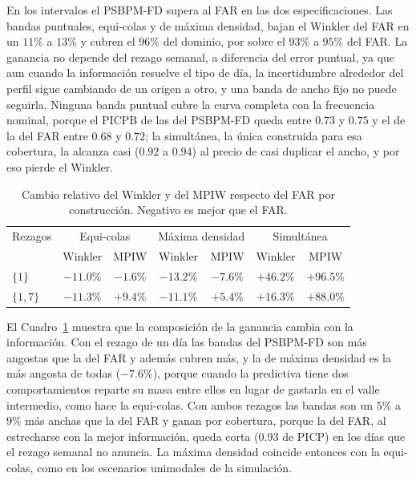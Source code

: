 En los intervalos el PSBPM-FD supera al FAR en las dos especificaciones. Las bandas puntuales, equi-colas y de máxima densidad, bajan el Winkler del FAR en un $11\%$ a $13\%$ y cubren el $96\%$ del dominio, por sobre el $93\%$ a $95\%$ del FAR. La ganancia no depende del rezago semanal, a diferencia del error puntual, ya que aun cuando la información resuelve el tipo de día, la incertidumbre alrededor del perfil sigue cambiando de un origen a otro, y una banda de ancho fijo no puede seguirla. Ninguna banda puntual cubre la curva completa con la frecuencia nominal, porque el PICPB de las del PSBPM-FD queda entre $0.73$ y $0.75$ y el de la del FAR entre $0.68$ y $0.72$; la simultánea, la única construida para esa cobertura, la alcanza casi ($0.92$ a $0.94$) al precio de casi duplicar el ancho, y por eso pierde el Winkler.

\begin{table}[H]
\centering\small
\setlength{\tabcolsep}{3pt}
\caption{Cambio relativo del Winkler y del MPIW respecto del FAR por construcción. Negativo es mejor que el FAR.}
\label{tab:apl_bloqueB_ganancia}
\begin{tabular}{l cc cc cc}
\hline
Rezagos & \multicolumn{2}{c}{Equi-colas} & \multicolumn{2}{c}{Máxima densidad} & \multicolumn{2}{c}{Simultánea} \\
 & Winkler & MPIW & Winkler & MPIW & Winkler & MPIW \\
\hline
$\{1\}$ & $-11.0\%$ & $-1.6\%$ & $-13.2\%$ & $-7.6\%$ & $+46.2\%$ & $+96.5\%$ \\
$\{1,7\}$ & $-11.3\%$ & $+9.4\%$ & $-11.1\%$ & $+5.4\%$ & $+16.3\%$ & $+88.0\%$ \\
\hline
\end{tabular}
\end{table}

El Cuadro~\ref{tab:apl_bloqueB_ganancia} muestra que la composición de la ganancia cambia con la información. Con el rezago de un día las bandas del PSBPM-FD son más angostas que la del FAR y además cubren más, y la de máxima densidad es la más angosta de todas ($-7.6\%$), porque cuando la predictiva tiene dos comportamientos reparte su masa entre ellos en lugar de gastarla en el valle intermedio, como hace la equi-colas. Con ambos rezagos las bandas son un $5\%$ a $9\%$ más anchas que la del FAR y ganan por cobertura, porque la del FAR, al estrecharse con la mejor información, queda corta ($0.93$ de PICP) en los días que el rezago semanal no anuncia. La máxima densidad coincide entonces con la equi-colas, como en los escenarios unimodales de la simulación.


